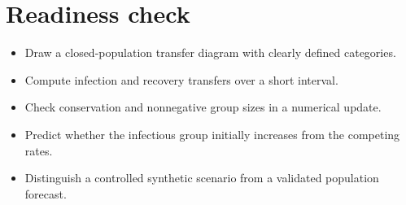 \documentclass[11pt,letterpaper]{article}
\theoremstyle{definition}\newtheorem{definition}{Definition}\newtheorem{example}{Example}
\numberwithin{equation}{section}
\begin{document}
\section*{Readiness check}
\begin{itemize}
\item Draw a closed-population transfer diagram with clearly defined categories.
\item Compute infection and recovery transfers over a short interval.
\item Check conservation and nonnegative group sizes in a numerical update.
\item Predict whether the infectious group initially increases from the competing rates.
\item Distinguish a controlled synthetic scenario from a validated population forecast.
\end{itemize}
\end{document}
